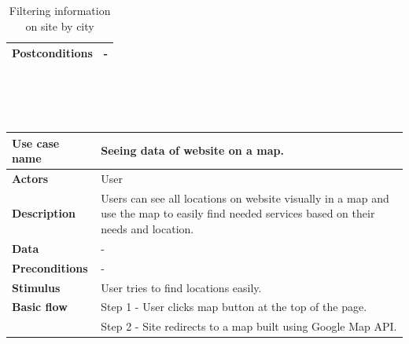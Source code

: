 \begin{center}
\begin{table}[H]
\begin{tabular}{| m{3cm}| m{10cm} |}
            \hline
            \textbf{Postconditions}   & -                                                                                                                                       \\
            \hline
        \end{tabular}
        \caption[Filtering information on site by city]{Filtering information on site by city}
    \end{table}
    ~\\~\\~\\
    \begin{table}[H]
        \begin{tabular}{| m{3cm}| m{10cm} |}
            \hline
            \textbf{Use case name}    & Seeing data of website on a map.                                                                                                           \\
            \hline
            \textbf{Actors}           & User                                                                                                                                       \\
            \hline
            \textbf{Description}      & Users can see all locations on website visually in a map and use the map to easily find needed services based on their needs and location. \\
            \hline
            \textbf{Data}             & -                                                                                                                                          \\
            \hline
            \textbf{Preconditions}    & -                                                                                                                                          \\
            \hline
            \textbf{Stimulus}         & User tries to find locations easily.                                                                                                       \\
            \hline
            \textbf{Basic flow}       & Step 1 - User clicks map button at the top of the page.                                                                                    \\
                                      & Step 2 - Site redirects to a map built using Google Map API.                                                                               \\

\end{tabular}
\end{table}
\end{center}
